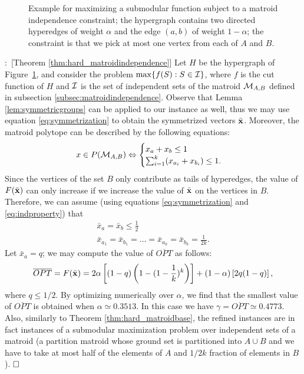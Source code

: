 \documentclass{article}[11pt]
\renewenvironment{proof}{\noindent{\bf Proof}:~}{$\hfill \Box$\\}
\def\bx{{\bf x}}
\def\cM{{\cal M}}
\def\cI{{\cal I}}
\def\max{{\rm{max}}}
\begin{document}
\begin{figure}


 \caption{Example for maximizing a submodular function subject to a matroid independence
constraint;  the hypergraph contains two directed hyperedges of weight $\alpha$
and the edge $(a,b)$ of weight $1-\alpha$; the constraint is that we pick
at most one vertex from each of $A$ and $B$.}
\label{fig:hardness_matroidindependence}
\end{figure}


\begin{proof}[Theorem \ref{thm:hard_matroidindependence}]
Let $H$ be the hypergraph of Figure~\ref{fig:hardness_matroidindependence},
and consider the problem $\max\{f(S): S\in \cI\}$, where $f$ is the cut function of $H$
and $\cI$ is the set of independent sets of the matroid $\cM_{A,B}$ defined in subsection
\ref{subsec:matroidindependence}. 
Observe that Lemma \ref{lem:symmetricgroups} can be applied to our instance  as well,
thus we may use equation \eqref{eq:symmetrization} to obtain the symmetrized
vectors $\bar{\bx}$.
Moreover, the matroid polytope can be described by the following equations:
\begin{equation}
\label{eq:indproperty}
x\in P(\cM_{A,B}) \Leftrightarrow 
\begin{cases} x_a+x_b\leq 1\\
\sum_{i=1}^k (x_{a_i}+x_{b_i})\leq1.
\end{cases}
\end{equation}
Since the vertices of the set $B$ only contribute as tails of hyperedges,
the value of $F(\bar{\bx})$ can only increase if we increase the value of $\bar{\bx}$ on
the vertices in $B$. Therefore, we can assume (using equations \eqref{eq:symmetrization} and
\eqref{eq:indproperty}) that
\begin{eqnarray*}
& \bar{x}_a=\bar{x}_b \leq \frac{1}{2} & \\
& \bar{x}_{a_1}=\bar{x}_{b_1}=\ldots=\bar{x}_{a_k}=\bar{x}_{b_k}=\frac{1}{2k}. &
\end{eqnarray*}
Let $\bar{x}_a = q$; we may compute the value of $\overline{OPT}$ as follows:
$$
\overline{OPT}=F(\bar{\bx})=2\alpha\left[(1-q) \left(1-(1-\frac{1}{k})^k\right)\right]
 + (1-\alpha)\left[2q(1-q)\right],
$$
where $q\leq 1/2$.
By optimizing numerically over $\alpha$, we find that the smallest value of $\overline{OPT}$
is obtained when $\alpha \simeq 0.3513$. In this case we have $\gamma=\overline{OPT}
 \simeq 0.4773$. Also, similarly to Theorem \ref{thm:hard_matroidbase},
the refined instances are in fact instances of a submodular maximization 
problem over independent sets of a matroid (a partition matroid whose ground set
is partitioned into $A\cup B$ and we have to take at most half of the elements of $A$
and $1/2k$ fraction of elements in $B$).
\end{proof}
\end{document}
